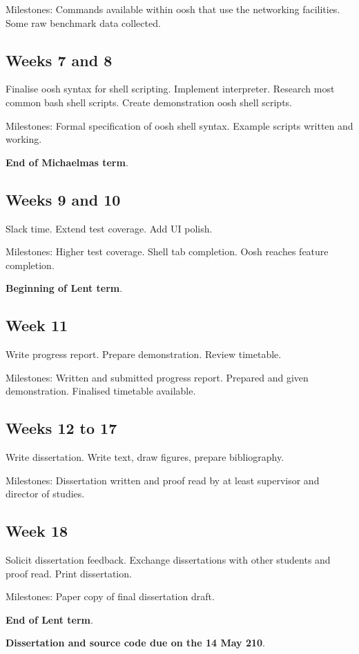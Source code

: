 \documentclass[12pt]{article}
\begin{document}
Milestones: Commands available within oosh that use the networking
facilities. Some raw benchmark data collected.

\subsection*{Weeks 7 and 8}
Finalise oosh syntax for shell scripting. Implement
interpreter. Research most common bash shell scripts. Create
demonstration oosh shell scripts.

Milestones: Formal specification of oosh shell syntax. Example scripts
written and working.

{\bf End of Michaelmas term}.

\subsection*{Weeks 9 and 10}
Slack time. Extend test coverage. Add UI polish.

Milestones: Higher test coverage. Shell tab completion. Oosh reaches
feature completion.

{\bf Beginning of Lent term}.

\subsection*{Week 11}
Write progress report. Prepare demonstration. Review timetable.

Milestones: Written and submitted progress report. Prepared and given
demonstration. Finalised timetable available.

\subsection*{Weeks 12 to 17}
Write dissertation. Write text, draw figures, prepare bibliography.

Milestones: Dissertation written and proof read by at least supervisor
and director of studies.

\subsection*{Week 18}
Solicit dissertation feedback. Exchange dissertations with other
students and proof read. Print dissertation.

Milestones: Paper copy of final dissertation draft.

{\bf End of Lent term}.

{\bf Dissertation and source code due on the 14 May 210}.
\end{document}
